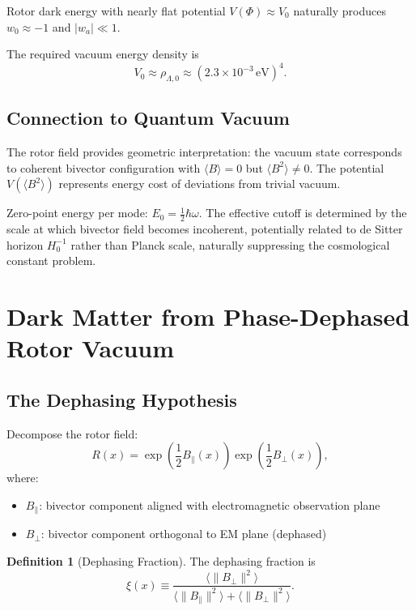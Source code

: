 \documentclass[11pt,a4paper]{article}
\numberwithin{equation}{section}
\theoremstyle{plain}
\theoremstyle{definition}
\newtheorem{definition}[theorem]{Definition}
\theoremstyle{remark}
\begin{document}
Rotor dark energy with nearly flat potential $V(\Phi) \approx V_0$ naturally produces $w_0 \approx -1$ and $|w_a| \ll 1$.

The required vacuum energy density is
\begin{equation}
V_0 \approx \rho_{\Lambda,0} \approx (2.3 \times 10^{-3}\,\mathrm{eV})^4.
\label{eq:vacuum-scale}
\end{equation}

\subsection{Connection to Quantum Vacuum}

The rotor field provides geometric interpretation: the vacuum state corresponds to coherent bivector configuration with $\langle B \rangle = 0$ but $\langle B^2 \rangle \neq 0$. The potential $V(\langle B^2 \rangle)$ represents energy cost of deviations from trivial vacuum.

Zero-point energy per mode: $E_0 = \frac{1}{2}\hbar\omega$. The effective cutoff is determined by the scale at which bivector field becomes incoherent, potentially related to de Sitter horizon $H_0^{-1}$ rather than Planck scale, naturally suppressing the cosmological constant problem.

\section{Dark Matter from Phase-Dephased Rotor Vacuum}
\label{sec:dark-matter}

\subsection{The Dephasing Hypothesis}

Decompose the rotor field:
\begin{equation}
R(x) = \exp\left(\frac{1}{2}B_\parallel(x)\right)\exp\left(\frac{1}{2}B_\perp(x)\right),
\label{eq:dm-decomposition}
\end{equation}
where:
\begin{itemize}
\item $B_\parallel$: bivector component aligned with electromagnetic observation plane
\item $B_\perp$: bivector component orthogonal to EM plane (dephased)
\end{itemize}

\begin{definition}[Dephasing Fraction]
The dephasing fraction is
\begin{equation}
\xi(x) \equiv \frac{\langle \|B_\perp\|^2 \rangle}{\langle \|B_\parallel\|^2 \rangle + \langle \|B_\perp\|^2 \rangle}.
\label{eq:dephasing-fraction}
\end{equation}
\end{definition}
\end{document}
